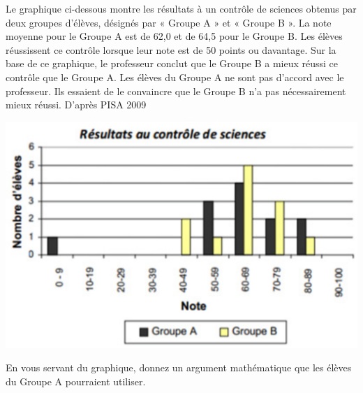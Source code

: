 
\begin{minipage}{0.5\linewidth}
Le graphique ci-dessous montre les résultats à un contrôle de sciences obtenus par deux groupes d'élèves, désignés par « Groupe A » et « Groupe B ». 
La note moyenne pour le Groupe A est de 62,0 et de 64,5 pour le Groupe B. Les élèves réussissent ce contrôle lorsque leur note est de 50 points ou davantage. Sur la base de ce graphique, le professeur conclut que le Groupe B a mieux réussi ce contrôle que le Groupe A. Les élèves du Groupe A ne sont pas d'accord avec le professeur. Ils essaient de le convaincre que le Groupe B n'a pas nécessairement mieux réussi. \hfill{{\scriptsize D'après PISA 2009}}
\end{minipage}
\begin{minipage}{0.5\linewidth}
\begin{center}
\includegraphics[scale=0.6]{Stat-13.eps} 
\end{center}
\end{minipage}
En vous servant du graphique, donnez un argument mathématique que les élèves du Groupe A pourraient utiliser. 

